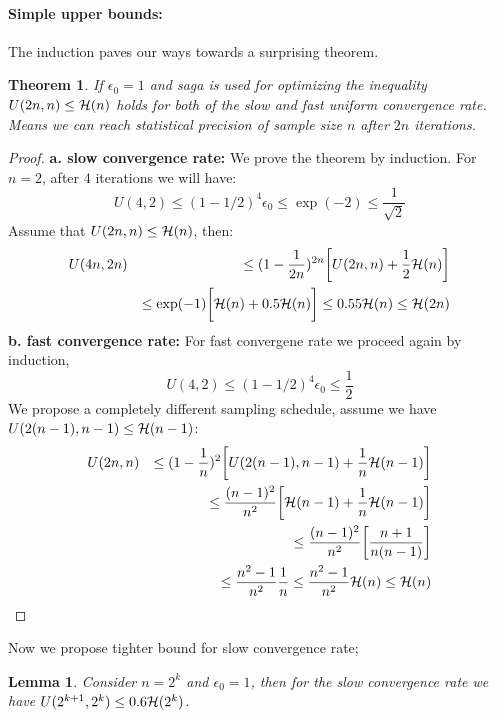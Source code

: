 \documentclass{article}
\newtheorem{theorem}{Theorem}
\newtheorem{lemma}{Lemma}
\newcommand{\bound}{{\cal H}}
\begin{document}
\paragraph{Simple upper bounds:}
The induction paves our ways towards a surprising theorem. 
\begin{theorem} \label{theorem:upper_bound_simple} If $\epsilon_0 = 1$ and saga
is used for optimizing the inequality $U(2n,n)\leq \bound(n)$ holds for both of the slow and fast uniform
convergence rate. Means we can reach statistical precision of sample size $n$
after $2n$ iterations.
\end{theorem}
\begin{proof}
	\textbf{a. slow convergence rate:} We prove the theorem by induction. For
	$n=2$, after $4$ iterations we will have: 
	\begin{equation*}
		U(4,2) \leq (1-1/2)^4 \epsilon_0  \leq \exp(-2) \leq 
		\frac{1}{\sqrt{2}}
	\end{equation*}
	Assume that $U(2n,n) \leq \bound(n)$, then: 
	\begin{eqnarray*}
		& U(4n,2n) & \leq (1-\frac{1}{2n})^{2n}\bigg[ U(2n,n) +  \frac{1}{2}
		\bound(n)\bigg] \\
		& & \leq \exp(-1) \bigg[ \bound(n) + 0.5 \bound(n) \bigg] \leq 0.55 \bound(n)
		\leq \bound(2n)
	\end{eqnarray*}
	\textbf{b. fast convergence rate:} 
	For fast convergene rate we proceed again by induction,
	 \begin{equation*}
		U(4,2) \leq (1-1/2)^4 \epsilon_0  \leq \frac{1}{2}
	\end{equation*}
	We propose a completely different sampling schedule, assume we have 
	$U(2(n-1),n-1) \leq \bound(n-1) $: 
	\begin{eqnarray*}
		& U(2n,n) & \leq (1-\frac{1}{n})^{2}\bigg[ U(2(n-1),n-1) +  \frac{1}{n}
		\bound(n-1)\bigg] \\
		& & \leq \frac{(n-1)^2}{n^2} \bigg[ \bound(n-1) + \frac{1}{n} \bound(n-1)
		\bigg] \\ 
		& & \leq \frac{(n-1)^2}{n^2} \bigg[ \frac{n+1}{n(n-1)} \bigg] \\
		& & \leq \frac{n^2 -1}{n^2} \frac{1}{n} \leq 
		 \frac{n^2 -1}{n^2} \bound(n) \leq \bound(n)
	\end{eqnarray*}
\end{proof}
Now we propose tighter bound for slow convergence rate; 
\begin{lemma} \label{theorem:statistical_upperbounds_slow_half}
	Consider $n=2^k$ and $\epsilon_0 = 1$, then 
	for the slow convergence rate we have $U(2^{k+1},2^k) \leq
	0.6 \bound(2^k)$.
\end{lemma}
\end{document}
